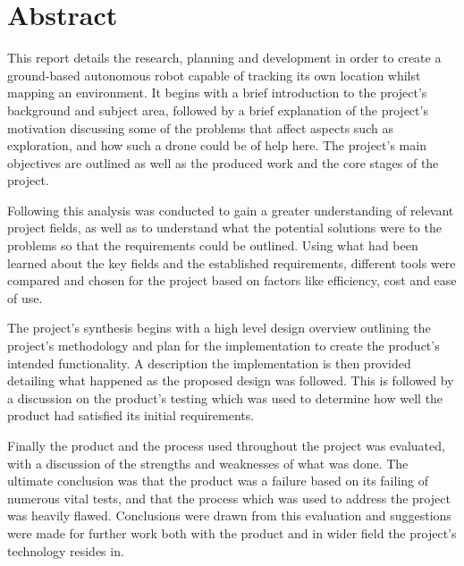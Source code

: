 \chapter{Abstract}
This report details the research, planning and development in order to create a ground-based autonomous robot capable of tracking its own location whilst mapping an environment. It begins with a brief introduction to the project's background and subject area, followed by a brief explanation of the project's motivation discussing some of the problems that affect aspects such as exploration, and how such a drone could be of help here. The project's main objectives are outlined as well as the produced work and the core stages of the project.

Following this analysis was conducted to gain a greater understanding of relevant project fields, as well as to understand what the potential solutions were to the problems so that the requirements could be outlined. Using what had been learned about the key fields and the established requirements, different tools were compared and chosen for the project based on factors like efficiency, cost and ease of use.

The project's synthesis begins with a high level design overview outlining the project's methodology and plan for the implementation to create the product's intended functionality. A description the implementation is then provided detailing what happened as the proposed design was followed. This is followed by a discussion on the product's testing which was used to determine how well the product had satisfied its initial requirements.

Finally the product and the process used throughout the project was evaluated, with a discussion of the strengths and weaknesses of what was done. The ultimate conclusion was that the product was a failure based on its failing of numerous vital tests, and that the process which was used to address the project was heavily flawed. Conclusions were drawn from this evaluation and suggestions were made for further work both with the product and in wider field the project's technology resides in.




